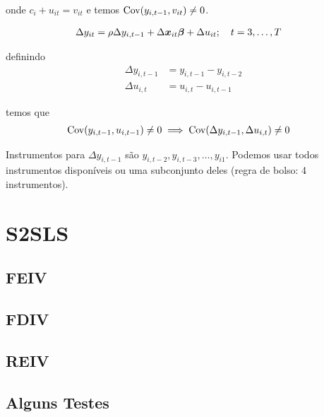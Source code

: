 \documentclass[11pt, oneside, a4paper, article]{article}
\numberwithin{equation}{section}
\begin{document}
\begin{description}
\noindent
onde $c_{i} + u_{it} = v_{it}$ e temos $\text{Cov}(y_{i,t-1}, v_{it}) \neq 0$.

\vspace{-1 em}
\begin{align*}
\Delta y_{it} &= \rho \Delta y_{i,t-1} + \Delta \boldsymbol{x}_{it} \boldsymbol{\beta} + \Delta u_{it}; 
\quad t=3, \dots, T
\end{align*}

\noindent
definindo
\begin{align*}
\Delta y_{i, t-1} &= y_{i, t-1} - y_{i, t-2}
\\
\Delta u_{i, t} &= u_{i, t} - u_{i, t-1}
\end{align*}

\noindent
temos que
\begin{align*}
\text{Cov}(y_{i,t-1}, u_{i,t-1}) & \neq 0 \implies 
\text{Cov}(\Delta y_{i, t-1}, \Delta u_{i,t}) \neq 0 
\end{align*}

Instrumentos para $\Delta y_{i,t-1}$ são $y_{i,t-2}, y_{i,t-3}, \dots, y_{i1}$.
Podemos usar todos instrumentos disponíveis ou uma subconjunto deles 
(regra de bolso: 4 instrumentos).

\clearpage
\section{S2SLS}

\subsection{FEIV}

\subsection{FDIV}

\subsection{REIV}

\subsection{Alguns Testes}


\end{description}
\end{document}
